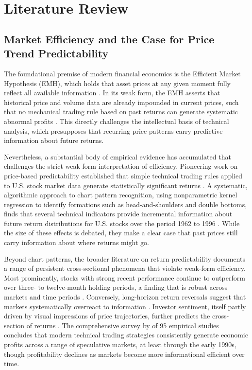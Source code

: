 \newpage
\section{Literature Review}

\subsection{Market Efficiency and the Case for Price Trend Predictability}

The foundational premise of modern financial economics is the Efficient Market Hypothesis (EMH), which holds that asset prices at any given moment fully reflect all available information \parencite{fama1970}. In its weak form, the EMH asserts that historical price and volume data are already impounded in current prices, such that no mechanical trading rule based on past returns can generate systematic abnormal profits \parencite{fama1970, fama1991}. This directly challenges the intellectual basis of technical analysis, which presupposes that recurring price patterns carry predictive information about future returns.

Nevertheless, a substantial body of empirical evidence has accumulated that challenges the strict weak-form interpretation of efficiency. Pioneering work on price-based predictability established that simple technical trading rules applied to U.S. stock market data generate statistically significant returns \parencite{brock1992}. A systematic, algorithmic approach to chart pattern recognition, using nonparametric kernel regression to identify formations such as head-and-shoulders and double bottoms, finds that several technical indicators provide incremental information about future return distributions for U.S. stocks over the period 1962 to 1996 \parencite{lo2000}. While the size of these effects is debated, they make a clear case that past prices still carry information about where returns might go.

Beyond chart patterns, the broader literature on return predictability documents a range of persistent cross-sectional phenomena that violate weak-form efficiency. Most prominently, stocks with strong recent performance continue to outperform over three- to twelve-month holding periods, a finding that is robust across markets and time periods \parencite{Jegadeesh1993}. Conversely, long-horizon return reversals suggest that markets systematically overreact to information \parencite{DeBondt1985}. Investor sentiment, itself partly driven by visual impressions of price trajectories, further predicts the cross-section of returns \parencite{Baker2006}. The comprehensive survey by \textcite{Park2007} of 95 empirical studies concludes that modern technical trading strategies consistently generate economic profits across a range of speculative markets, at least through the early 1990s, though profitability declines as markets become more informational efficient over time.

